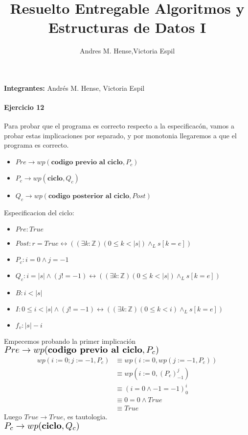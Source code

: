 \documentclass[a4paper]{article}
\title{Resuelto Entregable Algoritmos y Estructuras de Datos I}
\author{Andres M. Hense,Victoria Espil}
\date{}
\begin{document}




\begin{center}
\textbf{Integrantes:} Andrés M. Hense, Victoria Espil
\end{center}

\paragraph{Ejercicio 12}
Para probar que el programa es correcto respecto a la especificacón, vamos a probar estas implicaciones
 por separado, y por monotonia llegaremos a que el programa es correcto.\\
\begin{itemize}
\item $Pre \rightarrow wp(\textbf{codigo previo al ciclo},P_c)$
\item $P_c \rightarrow wp(\textbf{ciclo},Q_c)$
\item $Q_c \rightarrow wp(\textbf{codigo posterior al ciclo},Post)$
\end{itemize}
 Especificacion del ciclo:
	\begin{itemize}
		\item $Pre: True$
		\item $Post: r=True \leftrightarrow ((\exists k:\mathbb{Z})(0\leq k<|s|)\wedge_L s[k=e]) $
		\item $P_c: i=0\wedge j=-1$
		\item $Q_c: i=|s|\wedge (j!=-1)\leftrightarrow ((\exists k:\mathbb{Z})(0\leq k<|s|)\wedge_L s[k=e])$
		\item $B: i<|s|$
		\item $I: 0\leq i<|s|\wedge (j!=-1)\leftrightarrow ((\exists k:\mathbb{Z})(0\leq k<i)\wedge_L s[k=e]) $
		\item $f_v:|s|-i$
	\end{itemize}
Empecemos probando la primer implicación\\
$\scalebox{1.3}{$Pre\rightarrow wp(\textbf{codigo previo al ciclo},P_c)$}$\medskip \\
\begin{align*}
wp(i:=0; j:=-1,P_c)&\equiv wp(i:=0,wp(j:=-1,P_c))\\
&\equiv wp(i:=0,(P_c)_{-1}^{j})\\
&\equiv (i=0\wedge -1=-1)_{0}^{i}\\
&\equiv 0=0\wedge True\\
&\equiv True
\end{align*}
Luego $True\rightarrow True$, es tautologia.\medskip\\
$\scalebox{1.3}{$P_c \rightarrow wp(\textbf{ciclo},Q_c)$}$\medskip \\
\end{document}

